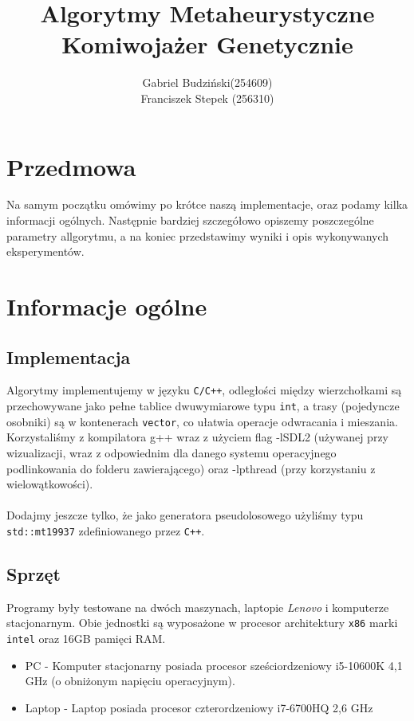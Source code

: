 \documentclass{article}
\title{\textbf{Algorytmy Metaheurystyczne\\Komiwojażer Genetycznie}}
\author{Gabriel Budziński(254609)\\Franciszek Stepek (256310)}
\date{}
\begin{document}
 
\maketitle

\section*{Przedmowa}
Na samym początku omówimy po krótce naszą implementacje, oraz podamy kilka informacji ogólnych. Następnie bardziej szczegółowo opiszemy poszczególne parametry allgorytmu, a na koniec przedstawimy wyniki i opis wykonywanych eksperymentów. 

\section{Informacje ogólne}
\subsection{Implementacja}
Algorytmy implementujemy w języku \texttt{C/C++}, odległości między wierzchołkami są przechowywane jako pełne tablice dwuwymiarowe typu \texttt{int}, a trasy (pojedyncze osobniki) są w kontenerach \texttt{vector}, co ułatwia operacje odwracania i mieszania.\\
Korzystaliśmy z kompilatora g++ wraz z użyciem flag -lSDL2 (używanej przy wizualizacji, wraz z odpowiednim dla danego systemu operacyjnego podlinkowania do folderu zawierającego) oraz -lpthread (przy korzystaniu z wielowątkowości).\\\\
Dodajmy jeszcze tylko, że jako generatora pseudolosowego użyliśmy typu \texttt{std::mt19937} zdefiniowanego przez \texttt{C++}.

\subsection{Sprzęt}
Programy były testowane na dwóch maszynach, laptopie \textit{Lenovo} i komputerze stacjonarnym. Obie jednostki są wyposażone w procesor architektury \texttt{x86} marki \texttt{intel} oraz 16GB pamięci RAM.
\begin{itemize}
	\item PC - Komputer stacjonarny posiada procesor sześciordzeniowy i5-10600K 4,1 GHz (o obniżonym napięciu operacyjnym).
	\item Laptop - Laptop posiada procesor czterordzeniowy i7-6700HQ 2,6 GHz
\end{itemize}
\end{document}
